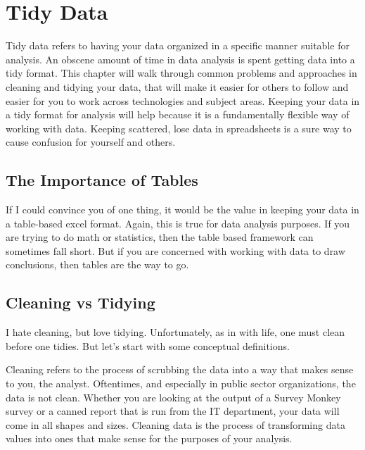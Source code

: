 \documentclass[]{book}
\begin{document}
\hypertarget{tidy-data}{%
\chapter{Tidy Data}\label{tidy-data}}

Tidy data refers to having your data organized in a specific manner suitable for analysis. An obscene amount of time in data analysis is spent getting data into a tidy format. This chapter will walk through common problems and approaches in cleaning and tidying your data, that will make it easier for others to follow and easier for you to work across technologies and subject areas. Keeping your data in a tidy format for analysis will help because it is a fundamentally flexible way of working with data. Keeping scattered, lose data in spreadsheets is a sure way to cause confusion for yourself and others.

\hypertarget{the-importance-of-tables}{%
\section{The Importance of Tables}\label{the-importance-of-tables}}

If I could convince you of one thing, it would be the value in keeping your data in a table-based excel format. Again, this is true for data analysis purposes. If you are trying to do math or statistics, then the table based framework can sometimes fall short. But if you are concerned with working with data to draw conclusions, then tables are the way to go.

\hypertarget{cleaning-vs-tidying}{%
\section{Cleaning vs Tidying}\label{cleaning-vs-tidying}}

I hate cleaning, but love tidying. Unfortunately, as in with life, one must clean before one tidies. But let's start with some conceptual definitions.

Cleaning refers to the process of scrubbing the data into a way that makes sense to you, the analyst. Oftentimes, and especially in public sector organizations, the data is not clean. Whether you are looking at the output of a Survey Monkey survey or a canned report that is run from the IT department, your data will come in all shapes and sizes. Cleaning data is the process of transforming data values into ones that make sense for the purposes of your analysis.
\end{document}
